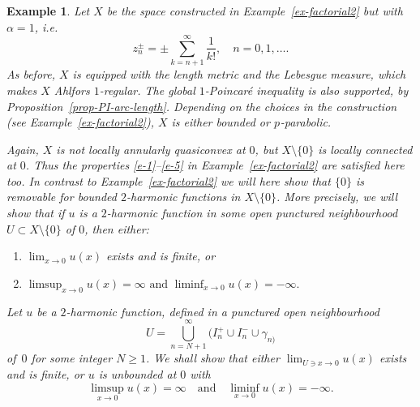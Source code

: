 \documentclass[a4paper,twoside]{article}
\theoremstyle{propositional}
\theoremstyle{descriptive}
\newtheorem{example}[thm]{Example}
\theoremstyle{remarkstyle}
\newcommand{\setm}{\setminus}
\newcommand{\al}{\alpha}
\newcommand{\ga}{\gamma}
\newcommand{\p}{{$p\mspace{1mu}$}}
\newcommand{\zpm}{z^\pm}
\newcommand{\Ipl}{I^+}
\newcommand{\Imin}{I^-}
\numberwithin{equation}{section}
\begin{document}
\begin{example} \label{ex-factorial3}
Let $X$ be the space constructed in Example~\ref{ex-factorial2} but
with $\al=1$, i.e.\ 
\[
\zpm_n=\pm \sum_{k=n+1}^\infty \frac{1}{k!}, \quad n=0,1,\dots.
\] 
As before, $X$ is equipped with the length metric and the Lebesgue
measure, which makes $X$ Ahlfors $1$-regular.
The global $1$-Poincar\'e inequality is also
supported, by Proposition~\ref{prop-PI-arc-length}.
Depending on the choices in the construction 
(see Example~\ref{ex-factorial2}),
$X$ is either bounded or \p-parabolic.

Again, $X$ is not locally annularly quasiconvex at $0$,
but $X \setm \{0\}$ is locally connected at $0$.
Thus the properties \ref{e-1}--\ref{e-5} in Example~\ref{ex-factorial2}
are satisfied here too.
In contrast to Example~\ref{ex-factorial2} we will here
show that $\{0\}$ is removable for bounded $2$-harmonic functions in $X\setm\{0\}$.
More precisely, we will show that
if $u$ is a $2$-harmonic function in some open punctured neighbourhood $U \subset X \setm \{0\}$
of $0$, then either:
\newlength{\saveitemsep}%
\setlength{\saveitemsep}{\itemsep}%

\begin{enumerate}
\renewcommand{\theenumi}{\textup{(\roman{enumi})}}%
\setlength{\itemsep}{\saveitemsep}%
\item
$\displaystyle \lim_{x \to 0} u(x)$ exists and is finite, or 
\item
$ \displaystyle 
\limsup_{x\to0} u(x)=\infty 
\text{ and } 
\liminf_{x\to0} u(x)=-\infty.
$
\end{enumerate}


Let $u$ be a $2$-harmonic function, defined in a punctured open neighbourhood 
\[
U=\bigcup_{n=N+1}^\infty (\Ipl_n \cup \Imin_n\cup\ga_{n)}
\]
of~$0$ for some integer $N\ge1$.
We shall show that either $\lim_{U \ni x \to 0} u(x)$ exists and is finite,
or $u$ is unbounded at $0$ with
\[
\limsup_{x\to0} u(x)=\infty \quad \text{and}  \quad
\liminf_{x\to0} u(x)=-\infty.
\]


\end{example}
\end{document}

